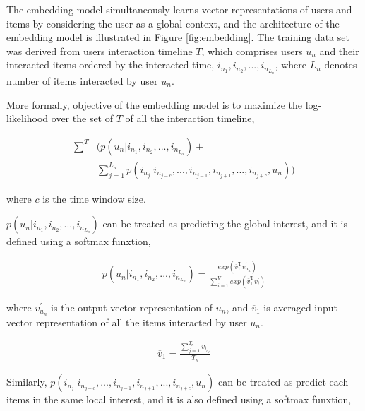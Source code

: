 \documentclass{sig-alternate-05-2015}
\begin{document}
The embedding model simultaneously learns vector representations of users and items
by considering the user as a global context,
and the architecture of the embedding model is illustrated in Figure \ref{fig:embedding}.
The training data set was derived from users interaction timeline $T$,
which comprises users $u_n$ and their interacted items
ordered by the interacted time,
$i_{n_1}, i_{n_2}, ..., i_{n_{L_n}}$,
where $L_n$ denotes number of items interacted by user $u_n$.

More formally, objective of the embedding model is to
maximize the log-likelihood over the set of $T$ of all the interaction timeline,

\begin{equation}
\begin{aligned}
	\sum^{T} &\bigg( p(u_n | i_{n_1}, i_{n_2}, ..., i_{n_{L_n}}) + \\
			 &\sum_{j=1}^{L_n} p(i_{n_j} | i_{n_{j-c}}, ..., i_{n_{j-1}}, i_{n_{j+1}},..., i_{n_{j+c}}, u_n) \bigg)
\end{aligned}
\end{equation}

where $c$ is the time window size.

$p(u_n | i_{n_1}, i_{n_2}, ..., i_{n_{L_n}})$ can be treated as predicting the global interest,
and it is defined using a softmax funxtion,

\begin{equation}
\begin{aligned}
	p(u_n | i_{n_1}, i_{n_2}, ..., i_{n_{L_n}}) =
	\frac
	{
		exp( \overline{v}_{1}^{\mathrm{T}} v_{u_n}^{'} )
	}
	{
		\sum_{i=1}^{V} exp( \overline{v}_{1}^{\mathrm{T}} v_{i}^{'} )
	}
\end{aligned}
\end{equation}

where $v_{u_n}^{'}$ is the output vector representation of $u_n$,
and $\overline{v}_{1}$ is averaged input vector representation of all the items
interacted by user $u_n$.

\begin{equation}
\begin{aligned}
	\overline{v}_{1} = \frac{\sum_{j=1}^{T_n} v_{i_{n_j}}}{T_n}
\end{aligned}
\end{equation}

Similarly, $p(i_{n_j} | i_{n_{j-c}}, ..., i_{n_{j-1}}, i_{n_{j+1}},..., i_{n_{j+c}}, u_n)$
can be treated as predict each items in the same local interest,
and it is also defined using a softmax funxtion,
\end{document}
